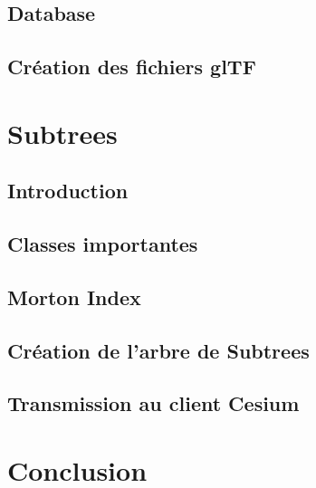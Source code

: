 \documentclass[
    TIC, %
    il, %
]{heig-tb}
\begin{document}
\section{Database}
\label{sec:database}


\section{Création des fichiers glTF}
\label{sec:gltf}


\chapter{Subtrees}
\label{chap:subtrees}

\section{Introduction}
\label{sec:subtrees-intro}


\section{Classes importantes}
\label{sec:classes}


\section{Morton Index}
\label{sec:morton}


\section{Création de l'arbre de Subtrees}
\label{sec:subtree-creation}


\section{Transmission au client Cesium}
\label{sec:transmission}


\chapter{Conclusion}
\label{sec:conclusion}


\clearpage
\printbibliography
\end{document}
